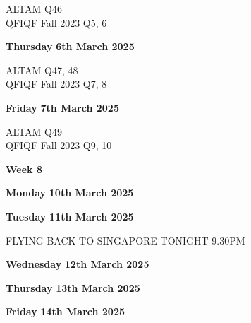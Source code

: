 \documentclass[hidelinks, 12pt]{article}
\theoremstyle{mydefstyle}
\theoremstyle{mythmstyle}
\begin{document}
ALTAM Q46 \\
QFIQF Fall 2023 Q5, 6

\textbf{Thursday} \hfill \textbf{6th March 2025}

ALTAM Q47, 48 \\
QFIQF Fall 2023 Q7, 8

\textbf{Friday} \hfill \textbf{7th March 2025}

ALTAM Q49 \\
QFIQF Fall 2023 Q9, 10

\begin{center}
\textbf{Week 8}
\end{center}

\textbf{Monday} \hfill \textbf{10th March 2025}

\textbf{Tuesday} \hfill \textbf{11th March 2025}

FLYING BACK TO SINGAPORE TONIGHT 9.30PM

\textbf{Wednesday} \hfill \textbf{12th March 2025}

\textbf{Thursday} \hfill \textbf{13th March 2025}

\textbf{Friday} \hfill \textbf{14th March 2025}
\end{document}

